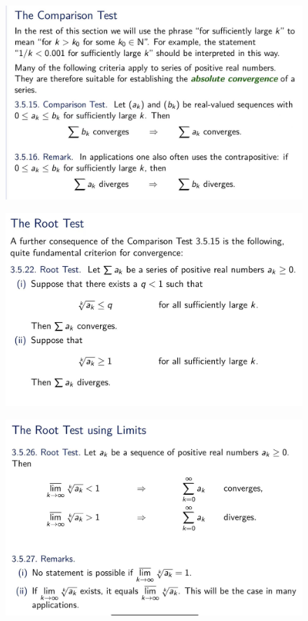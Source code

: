 \documentclass{beamer}
\begin{document}
\begin{frame}
    \begin{figure}[htbp]
        \centering
        \includegraphics[width=12cm]{comparison.jpg}
    \end{figure}
\end{frame}

\begin{frame}
    \begin{figure}[htbp]
        \centering
        \includegraphics[width=12cm]{root.jpg}
    \end{figure}
\end{frame}
\begin{frame}
    \begin{figure}[htbp]
        \centering
        \includegraphics[width=12cm]{root_limit.jpg}
    \end{figure}
\end{frame}
\end{document}
